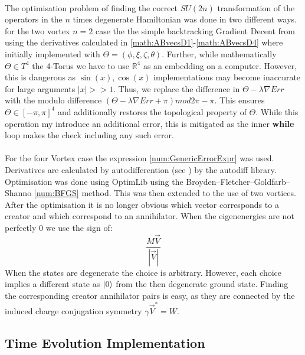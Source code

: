 \documentclass[Master]{subfiles}
\begin{document}
\hspace{1cm}\\
The optimisation problem of finding the correct $SU(2n)$ transformation of the operators in the $n$ times degenerate Hamiltonian was done in two different ways.
for the two vortex $n=2$ case the the simple backtracking Gradient Decent from  using the derivatives calculated in \eqref{math:ABvecsD1}-\eqref{math:ABvecsD4} where initially implemented with $\Theta = (\phi,\xi,\zeta,\theta)$.
Further, while mathematically $\Theta \in T^4$ the 4-Torus we have to use $\mathbb{R}^4$ as an embedding on a computer.
However, this is dangerous as $\sin(x), \cos(x)$ implementations may become inaccurate for large arguments $|x|>>1$. Thus, we replace the difference in $\Theta - \lambda \nabla Err$ with the modulo  difference $(\Theta - \lambda \nabla Err + \pi ) mod2\pi-\pi$. This ensures $\Theta \in [-\pi,\pi]^4$ and additionally restores the topological property of $\Theta$. While this operation my introduce an additional error, this is mitigated as the inner \textbf{{while}} loop makes the check including any such error.\\
\hspace{1cm}\\
For the four Vortex case the expression \eqref{num:GenericErrorExpr} was used. Derivatives are calculated by autodifferention (see ) by the autodiff \cite{autodiff} library. Optimisation was done using  OptimLib \cite{optimlib} using the Broyden–Fletcher–Goldfarb–Shanno  \ref{num:BFGS} method. This was then extended to the use of two vortices. After the optimisation it is no longer obvious which vector corresponds to a creator and which correspond  to an annihilator. 
When the eigenenergies are not perfectly $0$ we use the sign of:
$$
\frac{M \Vec{V}}{|\Vec{V}|}
$$
When the states are degenerate the choice is arbitrary. However, each choice implies a different state as $\ket{0}$ from the then degenerate ground state. Finding the corresponding creator annihilator pairs is easy, as they are connected by the induced charge conjugation symmetry $\gamma\vec{V}^* = {W}$.

\subsection{Time Evolution Implementation}
\end{document}
